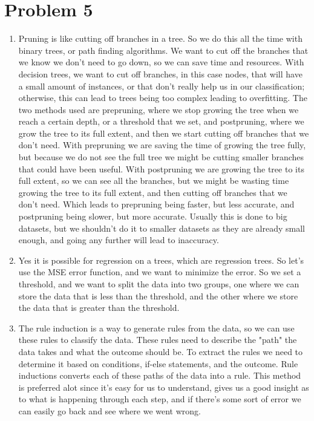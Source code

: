 \documentclass{article}
\begin{document}
\section*{Problem 5}
\begin{enumerate}[label=(\alph*)]
    \item Pruning is like cutting off branches in a tree. So we do this all the time with binary trees, or path finding algorithms. We want to cut off the branches that we know we don't need to go down, so we can save time and resources.
    With decision trees, we want to cut off branches, in this case nodes, that will have a small amount of instances, or that don't really help us in our classification; otherwise, this can lead to trees being too complex leading to overfitting. 
    The two methods used are prepruning, where we stop growing the tree when we reach a certain depth, or a threshold that we set, and postpruning, where we grow the tree to its full extent, and then we start cutting off branches that we don't need.
    With prepruning we are saving the time of growing the tree fully, but because we do not see the full tree we might be cutting smaller branches that could have been useful. With postpruning we are growing the tree to its full extent, so we can see all the branches, but we might be wasting time growing the tree to its full extent, and then cutting off branches that we don't need.
    Which leads to prepruning being faster, but less accurate, and postpruning being slower, but more accurate. Usually this is done to big datasets, but we shouldn't do it to smaller datasets as they are already small enough, and going any further will lead to inaccuracy.
    \item Yes it is possible for regression on a trees, which are regression trees. So let's use the MSE error function, and we want to minimize the error. So we set a threshold, and we want to split the data into two groups, one where we can store the data that is less than the threshold, and the other where we store the data that is greater than the threshold.
    \item The rule induction is a way to generate rules from the data, so we can use these rules to classify the data. These rules need to describe the "path" the data takes and what the outcome should be. To extract the rules we need to determine it based on conditions, if-else statements, and the outcome. Rule inductions converts each of these paths of the data into a rule. This method is preferred alot since it's easy for us to understand, gives us a good insight as to what is happening through each step, and if there's some sort of 
    error we can easily go back and see where we went wrong.
\end{enumerate}
\end{document}
